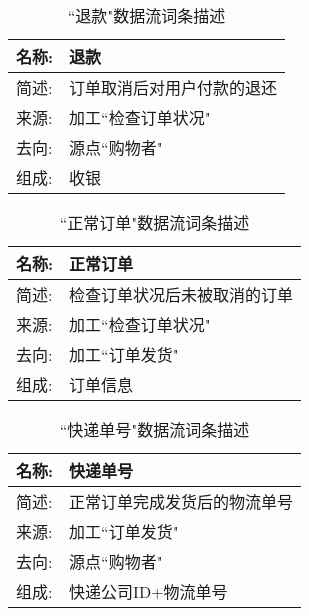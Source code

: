     \begin{table}[H]  
    \caption{``退款"数据流词条描述}  
    \begin{center}  
        \begin{tabular}{l p{11cm}} 
            \hline
            \quad 名称:  &   退款 \\
            \hline
            \quad 简述:  & 订单取消后对用户付款的退还 \\
            \hline
            \quad 来源:  & 加工``检查订单状况" \\
            \hline
            \quad 去向:  & 源点``购物者" \\
            \hline
            \quad 组成:  & 收银  \\
            \hline
        \end{tabular}
        \label{tab1}
    \end{center}
    \end{table}
    
    \begin{table}[H]  
    \caption{``正常订单"数据流词条描述}  
    \begin{center}  
        \begin{tabular}{l p{11cm}} 
            \hline
            \quad 名称:  &   正常订单 \\
            \hline
            \quad 简述:  & 检查订单状况后未被取消的订单 \\
            \hline
            \quad 来源:  & 加工``检查订单状况" \\
            \hline
            \quad 去向:  & 加工``订单发货" \\
            \hline
            \quad 组成:  & 订单信息  \\
            \hline
        \end{tabular}
        \label{tab1}
    \end{center}
    \end{table}
    
    \begin{table}[H]  
    \caption{``快递单号"数据流词条描述}  
    \begin{center}  
        \begin{tabular}{l p{11cm}} 
            \hline
            \quad 名称:  &   快递单号 \\
            \hline
            \quad 简述:  & 正常订单完成发货后的物流单号 \\
            \hline
            \quad 来源:  & 加工``订单发货" \\
            \hline
            \quad 去向:  &  源点``购物者"\\
            \hline
            \quad 组成:  & 快递公司ID+物流单号  \\
            \hline
        \end{tabular}
        \label{tab1}
    \end{center}
    \end{table}
    
